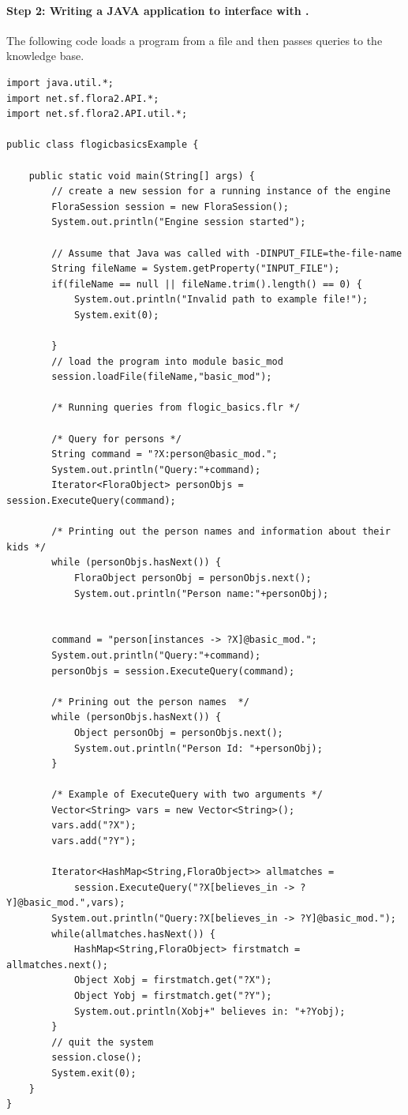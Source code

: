 \paragraph{Step 2:  Writing a JAVA application to interface with \FLSYSTEM.}
 The following code loads a \FLSYSTEM program from a file and then passes
 queries to the knowledge base.

\begin{verbatim}
import java.util.*;
import net.sf.flora2.API.*;
import net.sf.flora2.API.util.*;

public class flogicbasicsExample {

    public static void main(String[] args) {
        // create a new session for a running instance of the engine
        FloraSession session = new FloraSession();
        System.out.println("Engine session started");

        // Assume that Java was called with -DINPUT_FILE=the-file-name
        String fileName = System.getProperty("INPUT_FILE");
        if(fileName == null || fileName.trim().length() == 0) {
            System.out.println("Invalid path to example file!");
            System.exit(0);

        }
        // load the program into module basic_mod
        session.loadFile(fileName,"basic_mod");

        /* Running queries from flogic_basics.flr */

        /* Query for persons */
        String command = "?X:person@basic_mod.";
        System.out.println("Query:"+command);
        Iterator<FloraObject> personObjs = session.ExecuteQuery(command);

        /* Printing out the person names and information about their kids */
        while (personObjs.hasNext()) {
            FloraObject personObj = personObjs.next();
            System.out.println("Person name:"+personObj);


        command = "person[instances -> ?X]@basic_mod.";
        System.out.println("Query:"+command);
        personObjs = session.ExecuteQuery(command);

        /* Prining out the person names  */
        while (personObjs.hasNext()) {
            Object personObj = personObjs.next();
            System.out.println("Person Id: "+personObj);
        }

        /* Example of ExecuteQuery with two arguments */
        Vector<String> vars = new Vector<String>();
        vars.add("?X");
        vars.add("?Y");

        Iterator<HashMap<String,FloraObject>> allmatches =
            session.ExecuteQuery("?X[believes_in -> ?Y]@basic_mod.",vars);
        System.out.println("Query:?X[believes_in -> ?Y]@basic_mod.");
        while(allmatches.hasNext()) {
            HashMap<String,FloraObject> firstmatch = allmatches.next();
            Object Xobj = firstmatch.get("?X");
            Object Yobj = firstmatch.get("?Y");
            System.out.println(Xobj+" believes in: "+?Yobj);
        }
        // quit the system
        session.close();
        System.exit(0);
    }
}
\end{verbatim}

